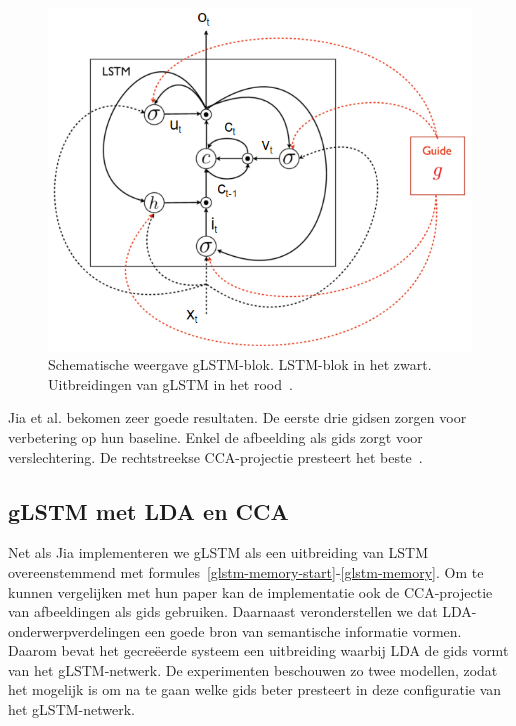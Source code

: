 \begin{figure}[tb]
	\centering
	\includegraphics[width=\linewidth]{Images/jia}
	\caption[Schematische weergave gLSTM-blok]{Schematische weergave gLSTM-blok. LSTM-blok in het zwart. Uitbreidingen van gLSTM in het rood~\cite{Fernando2015}.}
	\label{fig:glstm}
\end{figure}

Jia et al. bekomen zeer goede resultaten. De eerste drie gidsen zorgen voor verbetering op hun baseline. Enkel de afbeelding als gids zorgt voor verslechtering. De rechtstreekse CCA-projectie presteert het beste~\cite{Fernando2015}.

\subsection{gLSTM met LDA en CCA}
Net als Jia implementeren we gLSTM als een uitbreiding van LSTM overeenstemmend met formules~\eqref{glstm-memory-start}-\eqref{glstm-memory}.
Om te kunnen vergelijken met hun paper kan de implementatie ook de CCA-projectie van afbeeldingen als gids gebruiken.
Daarnaast veronderstellen we dat LDA-onderwerpverdelingen een goede bron van semantische informatie vormen. Daarom bevat het gecre\"eerde systeem een uitbreiding waarbij LDA de gids vormt van het gLSTM-netwerk.
De experimenten beschouwen zo twee modellen, zodat het mogelijk is om na te gaan welke gids beter presteert in deze configuratie van het gLSTM-netwerk.

